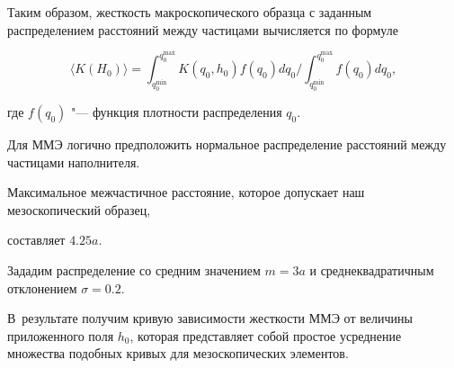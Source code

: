 Таким образом, жесткость макроскопического образца с заданным распределением расстояний между частицами вычисляется по формуле

\begin{equation}                                                          

\label{eq:Esum}%

\langle K(H_0) \rangle = {\int_{q_0^{\text{min}}}^{q_0^{\text{max}}} K(q_0,h_0)f(q_0)dq_0}

\bigg/{\int_{q_0^{\text{min}}}^{q_0^{\text{max}}} f(q_0)dq_0},

\end{equation}

где $f(q_0)$ "--- функция плотности распределения $q_0$. 

Для ММЭ логично предположить нормальное распределение расстояний между частицами наполнителя. 

Максимальное межчастичное расстояние, которое допускает  наш мезоскопический образец, 

составляет $4.25a$. 

Зададим распределение со средним значением $m=3a$ и среднеквадратичным отклонением $\sigma=0.2$. 

В~результате получим кривую зависимости жесткости ММЭ от величины приложенного поля $h_0$, которая представляет собой простое усреднение множества подобных кривых для мезоскопических элементов. 



